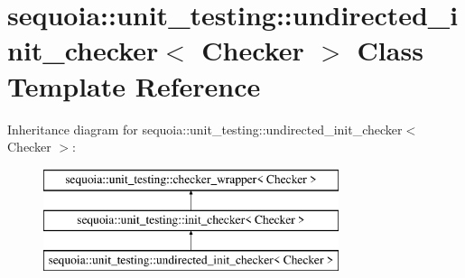 \hypertarget{classsequoia_1_1unit__testing_1_1undirected__init__checker}{}\section{sequoia\+::unit\+\_\+testing\+::undirected\+\_\+init\+\_\+checker$<$ Checker $>$ Class Template Reference}
\label{classsequoia_1_1unit__testing_1_1undirected__init__checker}
Inheritance diagram for sequoia\+::unit\+\_\+testing\+::undirected\+\_\+init\+\_\+checker$<$ Checker $>$\+:\begin{figure}[H]
\begin{center}
\leavevmode
\includegraphics[height=3.000000cm]{classsequoia_1_1unit__testing_1_1undirected__init__checker}
\end{center}
\end{figure}
